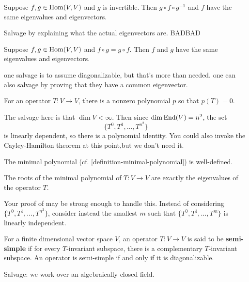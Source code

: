 \documentclass{homework}
\begin{document}
\begin{problem}
  Suppose $f, g \in \operatorname{Hom}(V,V)$ and $g$ is invertible.  Then $g \circ f \circ g^{-1}$ and $f$ have the same eigenvalues and eigenvectors.
\end{problem}

\begin{solution}
  Salvage by explaining what the actual eigenvectors are.  BADBAD
\end{solution}

\begin{problem}
  Suppose $f,g \in \operatorname{Hom}(V,V)$ and $f \circ g = g \circ f$.  Then $f$ and $g$ have the same eigenvalues and eigenvectors.
\end{problem}

\begin{solution} one salvage is to assume diagonalizable, but that's more than needed.  one can also salvage by proving that they have a common eigenvector.
\end{solution}

\begin{problem}\label{every-operator-satisfies-a-polynomial}
  For an operator $T : V \to V$, there is a nonzero polynomial $p$
  so that $p(T) = 0$.
\end{problem}

\begin{solution}
  The salvage here is that $\dim V < \infty$.  Then since $\dim \operatorname{End}(V) = n^2$, the set
  \[
    \{ T^0, T^1, \ldots, T^{n^2} \}
  \]
  is linearly dependent, so there is a polynomial identity.  You could also invoke the Cayley-Hamilton theorem at this point,but we don't need it.
\end{solution}

\begin{problem}
  The minimal polynomial (cf. \ref{definition-minimal-polynomial}) is well-defined.
\end{problem}

\begin{problem}
  The roots of the minimal polynomial of $T : V \to V$ are exactly the
  eigenvalues of the operator $T$.
\end{problem}

\begin{solution}
  Your proof of \label{every-operator-satisfies-a-polynomial} may be strong enough to handle this.  Instead of considering $\{ T^0, T^1, \ldots, T^{n^2} \}$, consider instead the smallest $m$ such that $\{ T^0, T^1, \ldots, T^{m} \}$ is linearly independent.
\end{solution}

\begin{problem}
  For a finite dimensional vector space $V$, an operator $T : V \to V$
  is said to be \textbf{semi-simple} if for every $T$-invariant
  subspace, there is a complementary $T$-invariant subspace.  An
  operator is semi-simple if and only if it is diagonalizable.
\end{problem}
\begin{solution}
  Salvage: we work over an algebraically closed field.
\end{solution}
\end{document}

